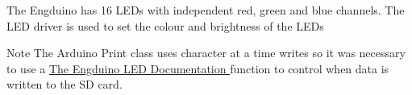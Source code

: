 The Engduino has 16 L\+E\+Ds with independent red, green and blue channels. The L\+E\+D driver is used to set the colour and brightness of the L\+E\+Ds

\begin{DoxyNote}{Note}
The Arduino Print class uses character at a time writes so it was necessary to use a \hyperlink{class_engduino_accelerometer_class}{The Engduino L\+E\+D Documentation } function to control when data is written to the S\+D card. 
\end{DoxyNote}
